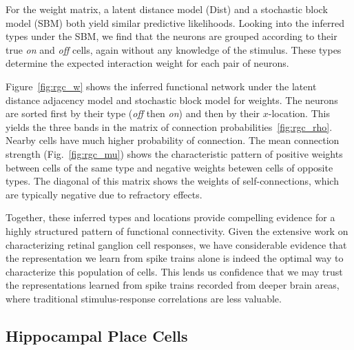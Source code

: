For the weight matrix, a latent distance model (Dist) and a stochastic
block model (SBM) both yield similar predictive likelihoods. Looking
into the inferred types under the SBM, we find that the neurons are
grouped according to their true \textit{on} and \textit{off} cells,
again without any knowledge of the stimulus. These types determine 
the expected interaction weight for each pair of neurons. 


Figure~\ref{fig:rgc_w} shows the inferred functional network under the
latent distance adjacency model and stochastic block model for
weights.  The neurons are sorted first by their type (\textit{off}
then \textit{on}) and then by their $x$-location. This yields the
three bands in the matrix of connection
probabilities~\ref{fig:rgc_rho}. Nearby cells have much higher
probability of connection. The mean connection strength
(Fig.~\ref{fig:rgc_mu}) shows the characteristic pattern of positive
weights between cells of the same type and negative weights betewen
cells of opposite types. The diagonal of this matrix shows the weights
of self-connections, which are typically negative due to refractory
effects. 

Together, these inferred types and locations provide 
compelling evidence for a highly structured pattern of functional 
connectivity. Given the extensive work on characterizing retinal 
ganglion cell responses, we have considerable evidence that the 
representation we learn from spike trains alone is indeed the 
optimal way to characterize this population of cells. This 
lends us confidence that we may trust the representations learned from 
spike trains recorded from deeper brain areas, where traditional 
stimulus-response correlations are less valuable.

\subsection{Hippocampal Place Cells}


